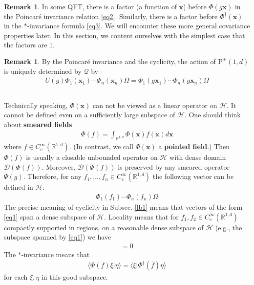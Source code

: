 \documentclass[12pt,b5paper,notitlepage]{article}
\theoremstyle{definition}
\newtheorem{rem}[df]{Remark}
\theoremstyle{plain}
\newcommand{\mc}{\mathcal}
\newcommand{\ovl}{\overline}
\newcommand{\Dom}{\scr{D}}
\newcommand{\bk}[1]{\langle {#1}\rangle}
\newcommand{\scr}{\mathscr}
\newcommand{\Rbb}{\mathbb R}
\newcommand{\Poid}{{\mathrm P}^+(1,d)}
\newcommand{\xbf}{\mathbf x}
\numberwithin{equation}{section}
\begin{document}
\begin{rem}
In some QFT, there is a factor (a function of $\xbf$) before $\Phi(g\xbf)$ in the Poincar\'e invariance relation \eqref{eq2}. Similarly, there is a factor before $\Phi^\dagger(\xbf)$ in the $*$-invariance formula \eqref{eq3}. We will encounter these more general covariance properties later. In this section, we content ourselves with the simplest case that the factors are $1$.
\end{rem}

\begin{rem}\label{lb7}
By the Poincar\'e invariance and the cyclicity, the action of $\Poid$ is uniquely determined by $\scr Q$ by
\begin{align}
U(g)\Phi_1(\xbf_1)\cdots\Phi_n(\xbf_n)\Omega=\Phi_1(g\xbf_1)\cdots\Phi_n(g\xbf_n)\Omega
\end{align}
\end{rem}


\subsection{}

Technically speaking, $\Phi(\xbf)$ can not be viewed as a linear operator on $\mc H$. It  cannot be defined even on a sufficiently large subspace of $\mc H$. One should think about \textbf{smeared fields} 
\begin{align}
\Phi(f)=\int_{\Rbb^{1,d}}\Phi(\xbf)f(\xbf)d\xbf
\end{align}
where $f\in C_c^\infty(\Rbb^{1,d})$. (In contrast, we call $\Phi(\xbf)$ a \textbf{pointed field}.) Then $\Phi(f)$ is usually a closable unbounded operator on $\mc H$ with dense domain $\Dom(\Phi(f))$. Moreover, $\Dom(\Phi(f))$ is preserved by any smeared operator $\Psi(g)$. Therefore, for any $f_1,\dots,f_n\in C_c^\infty(\Rbb^{1,d})$ the following vector can be defined in $\mc H$:
\begin{align}\label{eq1}
\Phi_1(f_1)\cdots\Phi_n(f_n)\Omega
\end{align}
The precise meaning of cyclicity in Subsec. \ref{lb1} means that vectors of the form \eqref{eq1} span a dense subspace of $\mc H$. Locality means that for $f_1,f_2\in C_c^\infty(\Rbb^{1,d})$ compactly supported in  regions, on a reasonable dense subspace of $\mc H$ (e.g., the subspace spanned by \eqref{eq1}) we have
\begin{align}
[\Phi_1(f_1),\Phi_2(f_2)]=0
\end{align}
The $*$-invariance means that
\begin{align}
\bk{\Phi(f)\xi|\eta}=\bk{\xi|\Phi^\dagger(\ovl f)\eta}
\end{align}
for each $\xi,\eta$ in this good subspace. 
\end{document}
